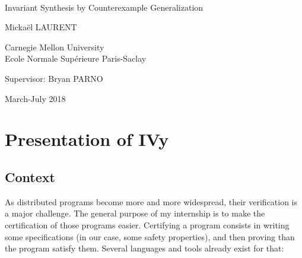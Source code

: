 \documentclass[11pt,a4paper,oldfontcommands,openany]{memoir}
\begin{document}
%
%
\thispagestyle{empty}

{%
\sffamily
\centering
\Large

~\vspace{\fill}

{\huge 
Invariant Synthesis by Counterexample Generalization
}

\vspace{2.5cm}

{\LARGE
Mickaël LAURENT
}

\vspace{3.5cm}

Carnegie Mellon University\\
Ecole Normale Supérieure Paris-Saclay

\vspace{3.5cm}

Supervisor: Bryan PARNO

\vspace{\fill}

March-July 2018

}%

\clearpage%

\tableofcontents*

\clearpage


\chapter{Presentation of IVy}

    \section{Context}

    As distributed programs become more and more widespread, their verification is a major challenge.
    The general purpose of my internship is to make the certification of those programs easier.
    Certifying a program consists in writing some specifications (in our case, some safety properties), and then proving than the program satisfy them.
    Several languages and tools already exist for that:
\end{document}
